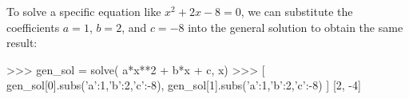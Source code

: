 
To solve a specific equation like $x^2+2x-8=0$,
we can substitute the coefficients $a=1$, $b=2$, and $c=-8$ into 
the general solution to obtain the same result:

\small
\begin{verbatimtab}
>>> gen_sol = solve( a*x**2 + b*x + c, x)
>>> [ gen_sol[0].subs({'a':1,'b':2,'c':-8}), 
      gen_sol[1].subs({'a':1,'b':2,'c':-8})  ]
[2, -4]
\end{verbatimtab}
\normalsize

